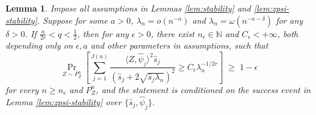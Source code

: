\documentclass[11pt,a4paper]{article}
\renewcommand{\hat}{\widehat}
\theoremstyle{definition}
\theoremstyle{plain}
\newtheorem{lemma}{Lemma}[section]
\theoremstyle{remark}
\begin{document}
\begin{lemma}
Impose all assumptions in Lemmas \ref{lem:stability} and \ref{lem:zpsi-stability}.
Suppose for some $a>0$, $\lambda_n=o(n^{-a})$ and $\lambda_n=\omega(n^{-a-\delta})$ for any $\delta>0$.
If $\frac{a}{2r}<q<\frac{1}{2}$, then for any $\epsilon>0$, there exist $n_\epsilon\in\mathbb N$ and $C_\epsilon<+\infty$, both depending only on $\epsilon,a$ and other parameters in assumptions, such that
$$
\Pr_{Z\sim P_Z^n}\left[\sum_{j=1}^{J(n)}\frac{\langle Z,\hat\psi_j\rangle^2\hat s_j}{(\hat s_j+2\sqrt{\hat s_j\lambda_n})^2} \geq C_\epsilon \lambda_n^{-1/2r}\right]\;\geq\;1-\epsilon
$$
for every $n\geq n_\epsilon$ and $P_Z^n$, and the statement is conditioned on the success event in Lemma \ref{lem:zpsi-stability} over $\{\hat s_j,\hat\psi_j\}$.
\label{lem:truncation-whp}
\end{lemma}
\end{document}
